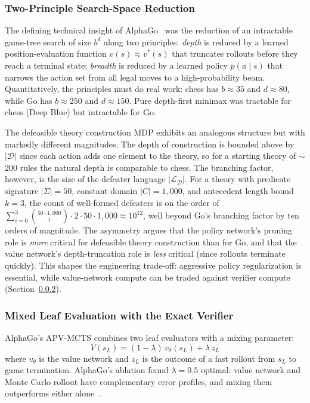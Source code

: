 \documentclass{article}
\newcommand{\D}{\mathcal{D}}
\begin{document}
\subsubsection{Two-Principle Search-Space Reduction}

The defining technical insight of AlphaGo~\cite{silver2016alphago} was the reduction of an intractable game-tree search of size $b^d$ along two principles: \emph{depth} is reduced by a learned position-evaluation function $v(s) \approx v^*(s)$ that truncates rollouts before they reach a terminal state; \emph{breadth} is reduced by a learned policy $p(a \mid s)$ that narrows the action set from all legal moves to a high-probability beam. Quantitatively, the principles must do real work: chess has $b \approx 35$ and $d \approx 80$, while Go has $b \approx 250$ and $d \approx 150$. Pure depth-first minimax was tractable for chess (Deep Blue) but intractable for Go.

The defeasible theory construction MDP exhibits an analogous structure but with markedly different magnitudes. The depth of construction is bounded above by $|\D|$ since each action adds one element to the theory, so for a starting theory of $\sim$200 rules the natural depth is comparable to chess. The branching factor, however, is the size of the defeater language $|\mathcal{L}_\D|$. For a theory with predicate signature $|\Sigma| = 50$, constant domain $|C| = 1{,}000$, and antecedent length bound $k = 3$, the count of well-formed defeaters is on the order of $\sum_{i=0}^{3} \binom{50 \cdot 1{,}000}{i} \cdot 2 \cdot 50 \cdot 1{,}000 \approx 10^{12}$, well beyond Go's branching factor by ten orders of magnitude. The asymmetry argues that the policy network's pruning role is \emph{more} critical for defeasible theory construction than for Go, and that the value network's depth-truncation role is \emph{less} critical (since rollouts terminate quickly). This shapes the engineering trade-off: aggressive policy regularization is essential, while value-network compute can be traded against verifier compute (Section~\ref{subsubsec:mixed-leaf}).

\subsubsection{Mixed Leaf Evaluation with the Exact Verifier}\label{subsubsec:mixed-leaf}

AlphaGo's APV-MCTS combines two leaf evaluators with a mixing parameter:
\[
    V(s_L) = (1 - \lambda) \, v_\theta(s_L) + \lambda \, z_L
\]
where $v_\theta$ is the value network and $z_L$ is the outcome of a fast rollout from $s_L$ to game termination. AlphaGo's ablation found $\lambda = 0.5$ optimal: value network and Monte Carlo rollout have complementary error profiles, and mixing them outperforms either alone~\cite{silver2016alphago}.
\end{document}
